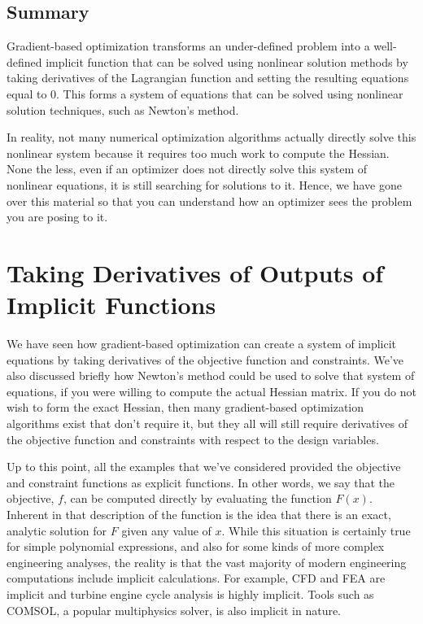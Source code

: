 \documentclass[conf]{new-aiaa}
\begin{document}
	
	
    \subsection{Summary}
    Gradient-based optimization transforms an under-defined problem into a well-defined implicit function that can be solved using nonlinear solution methods by taking derivatives of the Lagrangian function and setting the resulting equations equal to 0. 
    This forms a system of equations that can be solved using nonlinear solution techniques, such as Newton's method. 

    In reality, not many numerical optimization algorithms actually directly solve this nonlinear system because it requires too much work to compute the Hessian. 
    None the less, even if an optimizer does not directly solve this system of nonlinear equations, it is still searching for solutions to it. 
    Hence, we have gone over this material so that you can understand how an optimizer sees the problem you are posing to it. 

    \section{Taking Derivatives of Outputs of Implicit Functions}
    \label{sec:taking_derivs_of_implicit_functions}

    We have seen how gradient-based optimization can create a system of implicit equations by taking derivatives of the objective function and constraints. We've also discussed briefly how Newton's method could be used to solve that system of equations, if you were willing to compute the actual Hessian matrix.
    If you do not wish to form the exact Hessian, then many gradient-based optimization algorithms exist that don't require it, 
    but they all will still require derivatives of the objective function and constraints with respect to the design variables. 

    Up to this point, all the examples that we've considered provided the objective and constraint functions as explicit functions. 
    In other words, we say that the objective, $f$, can be computed directly by evaluating the function $F(x)$. 
    Inherent in that description of the function is the idea that there is an exact, analytic solution for $F$ given any value of $x$. 
    While this situation is certainly true for simple polynomial expressions, and also for some kinds of more complex engineering analyses, 
    the reality is that the vast majority of modern engineering computations include implicit calculations. 
    For example, CFD and FEA are implicit and turbine engine cycle analysis is highly implicit. 
    Tools such as COMSOL, a popular multiphysics solver, is also implicit in nature. 
\end{document}
